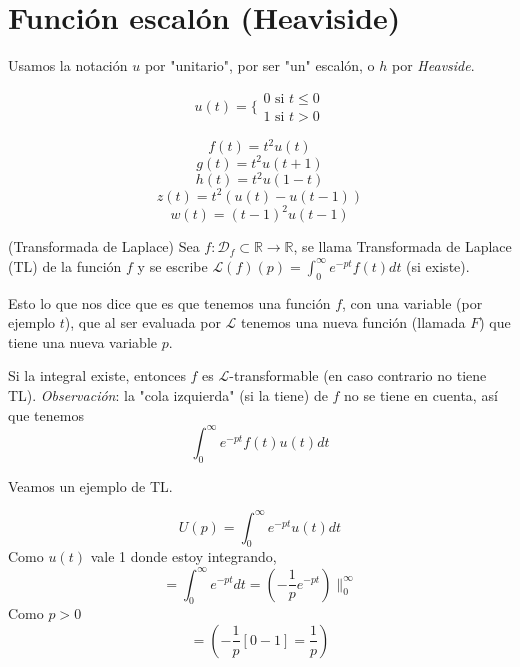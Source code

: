 \section{Funci\'on escal\'on (Heaviside)}

Usamos la notaci\'on $u$ por "unitario", por ser "un" escal\'on, o $h$ por \emph{Heavside}.


$$
u(t) = \lbrace{ \begin{matrix}
0 \textrm{ si } t \leq 0 \\
1 \textrm{ si } t > 0
\end{matrix} }
$$


$$f(t) = t^2u(t)$$
$$g(t) = t^2u(t+1)$$
$$h(t) = t^2u(1-t)$$
$$z(t) = t^2(u(t) - u(t-1))$$ %
$$w(t) = (t-1)^2 u(t-1)$$ 

\begin{definition}
(Transformada de Laplace) Sea $f: \mathcal{D}_f \subset \mathbb{R} \rightarrow \mathbb{R}$, se llama Transformada de Laplace (TL) de la funci\'on $f$ y se escribe $\mathcal{L}(f)(p) = \int_{0}^{\infty}e^{-pt}f(t)dt$ (si existe).
\end{definition}

Esto lo que nos dice que es que tenemos una funci\'on $f$, con una variable (por ejemplo $t$), que al ser evaluada por $\mathcal{L}$ tenemos una nueva funci\'on (llamada $F$) que tiene una nueva variable $p$.


Si la integral existe, entonces $f$ es $\mathcal{L}$-transformable (en caso contrario no tiene TL).
\emph{Observaci\'on}: la "cola izquierda" (si la tiene) de $f$ no se tiene en cuenta, as\'i que tenemos
$$
\int_{0}^{\infty}e^{-pt}f(t)u(t)dt
$$

Veamos un ejemplo de TL.

$$
U(p) = \int_0^{\infty}e^{-pt}u(t)dt
$$
Como $u(t)$ vale 1 donde estoy integrando,
$$
= \int_0^{\infty}e^{-pt}dt = (-\frac{1}{p}e^{-pt})\|^{\infty}_0
$$
Como $p > 0$
$$
= (-\frac{1}{p}\left[0 - 1\right] = \frac{1}{p})
$$

